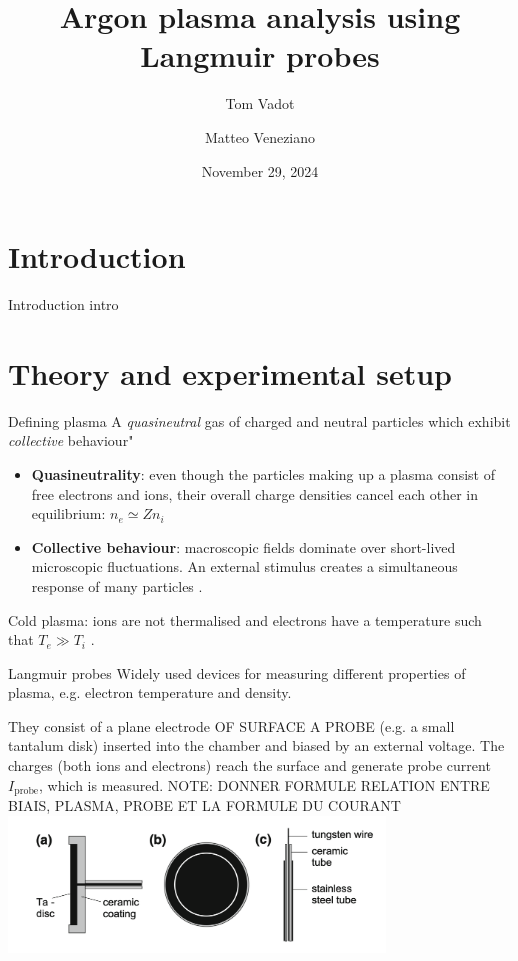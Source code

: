 \documentclass[10pt]{beamer}
\title[(À enlever)]{Argon plasma analysis using Langmuir probes}
\author[Tom Vadot \and Matteo Veneziano]{Tom Vadot \and Matteo Veneziano}
\institute[]{EPFL Section of Physics}
\date{November 29, 2024}
\newcommand{\probecurrent}[0]{\ensuremath{I_{\mathrm{probe}}}}
\begin{document}
\begin{frame}
    \titlepage
\end{frame}

\section{Introduction}
\begin{frame}{Introduction}
    intro
\end{frame}

\section{Theory and experimental setup}
\begin{frame}{Defining plasma}
    A \emph{quasineutral} gas of charged and neutral particles which exhibit \emph{collective} behaviour" 
    \vspace{0.5cm}
    \begin{itemize}
        \item \textbf{Quasineutrality}: even though the particles making up a plasma consist of free electrons and ions, their overall charge densities cancel each other in equilibrium: 
            $n_e \simeq Z n_i$ 

        \item \textbf{Collective behaviour}: macroscopic fields dominate over short-lived microscopic fluctuations.
            An external stimulus creates a simultaneous response of many particles .
    \end{itemize}
    \vspace{0.5cm}
    Cold plasma: ions are not thermalised and electrons have a temperature such that $T_e \gg T_i$ .
\end{frame}


\begin{frame}{Langmuir probes}
    Widely used devices for measuring different properties of plasma, e.g. electron temperature and density.
    \vspace{0.4cm}

    They consist of a plane electrode OF SURFACE A PROBE (e.g. a small tantalum disk) inserted into the chamber and biased by an external voltage.
    The charges (both ions and electrons) reach the surface and generate probe current $\probecurrent$, which is measured.
    NOTE: DONNER FORMULE RELATION ENTRE BIAIS, PLASMA, PROBE ET LA FORMULE DU COURANT
    \centering
    \includegraphics[width=0.75\textwidth]{../figures/langmuir_probe.png}
\end{frame}
\end{document}

